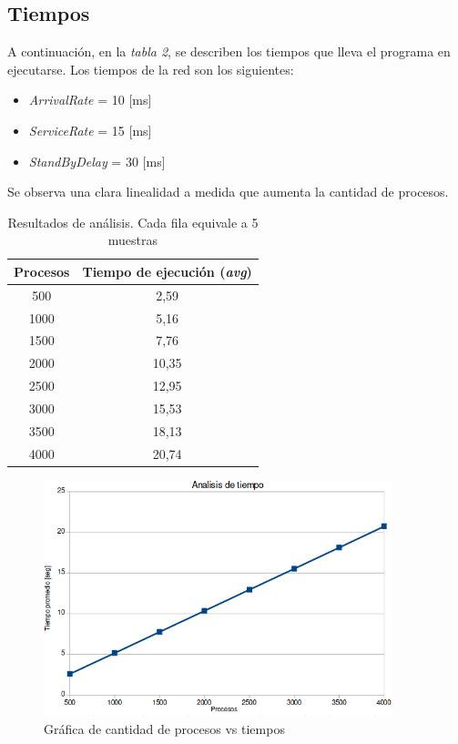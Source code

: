\documentclass{article}
\begin{document}
    \subsection{Tiempos}
    A continuación, en la \emph{tabla 2}, se describen los tiempos que lleva el programa en 
    ejecutarse. Los tiempos de la red son los siguientes: \par
    \begin{itemize}
        \item \emph{ArrivalRate} = 10 [ms]
        \item \emph{ServiceRate} = 15 [ms]
        \item \emph{StandByDelay} = 30 [ms]
    \end{itemize}
    Se observa una clara linealidad a medida que aumenta la cantidad de procesos. \par
    \begin{center}
        \begin{table}[h]
            \centering
            \begin{tabular}{||c|c||} 
                \hline
                Procesos & Tiempo de ejecución (\emph{avg}) \\ [0.5ex] 
                \hline\hline
                500 & 2,59 \\ 
                \hline
                1000 & 5,16 \\
                \hline
                1500 & 7,76 \\
                \hline
                2000 & 10,35 \\
                \hline
                2500 & 12,95 \\
                \hline
                3000 & 15,53 \\
                \hline
                3500 & 18,13 \\
                \hline
                4000 & 20,74 \\
                \hline
            \end{tabular}
            \caption{Resultados de análisis. Cada fila equivale a 5 muestras}
        \end{table}
    \end{center}
    \begin{figure}[h]
        \includegraphics[width=0.9\textwidth, center]{tiempos.png}
        \caption{Gráfica de cantidad de procesos vs tiempos}
    \end{figure}
\end{document}
